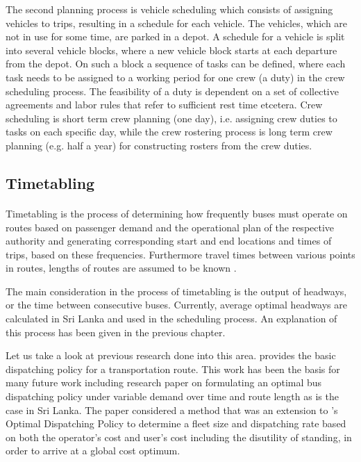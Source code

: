 \documentclass[12pt, oneside]{report}
\begin{document}
The second planning process is vehicle scheduling which consists of assigning vehicles to trips, resulting in a schedule for each vehicle. The vehicles, which are not in use for some time, are parked in a depot. A schedule for a vehicle is split into several vehicle blocks, where a new vehicle block starts at each departure from the depot. On such a block a sequence of tasks can be defined, where each task needs to be assigned to a working period for one crew (a duty) in the crew scheduling process. The feasibility of a duty is dependent on a set of collective agreements and labor rules that refer to sufficient rest time etcetera. Crew scheduling is short term crew planning (one day), i.e. assigning crew duties to tasks on each specific day, while the crew rostering process is long term crew planning (e.g. half a year) for constructing rosters from the crew duties.

\subsection{Timetabling}

\paragraph{ } Timetabling is the process of determining how frequently buses must operate on routes based on passenger demand and the operational plan of the respective authority and generating corresponding start and end locations and times of trips, based on these frequencies. Furthermore travel times between various points in routes, lengths of routes are assumed to be known \citep{Huisman2004}.

The main consideration in the process of timetabling is the output of headways, or the time between consecutive buses. Currently, average optimal headways are calculated in Sri Lanka and used in the scheduling process. An explanation of this process has been given in the previous chapter.

Let us take a look at previous research done into this area. \citet{Newell1971} provides the basic dispatching policy for a transportation route. This work has been the basis for many future work including \citet{Kumarage2007} research paper on formulating an optimal bus dispatching policy under variable demand over time and route length as is the case in Sri Lanka. The paper considered a method that was an extension to \citet{Newell1971}'s Optimal Dispatching Policy to determine a fleet size and dispatching rate based on both the operator's cost and user's cost including the disutility of standing, in order to arrive at a global cost optimum.
\end{document}

